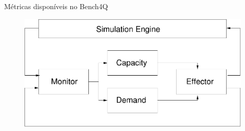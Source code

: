 \begin{frame}{Métricas disponíveis no Bench4Q}
	\begin{figure}[htb]
		\centering
		\includegraphics[scale=0.5]{../monograph/images/extension-block.pdf}	
	\end{figure}
\end{frame}